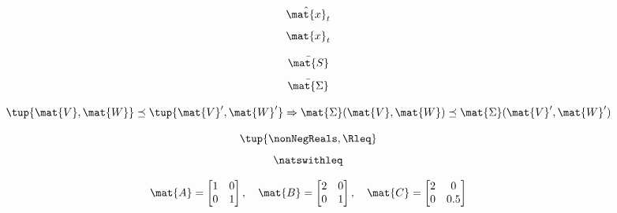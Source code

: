 {\begin{forslides}
        \begin{equation}
            \label{eq:x_estimate}
            \hat{\mat{x}}_t
        \end{equation}
        \begin{equation}
            \label{eq:x_real}
            \mat{x}_t
        \end{equation}

        \begin{equation}
            \label{eq:ric_1}
            \bar{\mat{S}}
        \end{equation}
        \begin{equation}
            \label{eq:ric_2}
            \bar{\mat{\Sigma}}
        \end{equation}

        \begin{equation}
            \label{eq:mon_est}
            \tup{\mat{V},\mat{W}}\preceq \tup{\mat{V}',\mat{W}'} \Rightarrow \mat{\Sigma}(\mat{V},\mat{W})\preceq \mat{\Sigma}(\mat{V}',\mat{W}')
        \end{equation}

        \begin{equation}
            \label{eq:posreals}
            \tup{\nonNegReals,{{\Rleq}}}
        \end{equation}
        \begin{equation}
            \label{eq:nats}
            \natswithleq
        \end{equation}

        \begin{equation}
            \label{eq:matrix_poset}
            \mat{A}=\begin{bmatrix}
                1 & 0 \\0& 1
            \end{bmatrix}, \quad \mat{B}=\begin{bmatrix}
                2 & 0 \\0& 1
            \end{bmatrix},\quad \mat{C}=\begin{bmatrix}
                2 & 0 \\0& 0.5
            \end{bmatrix}
        \end{equation}


\end{forslides}}
